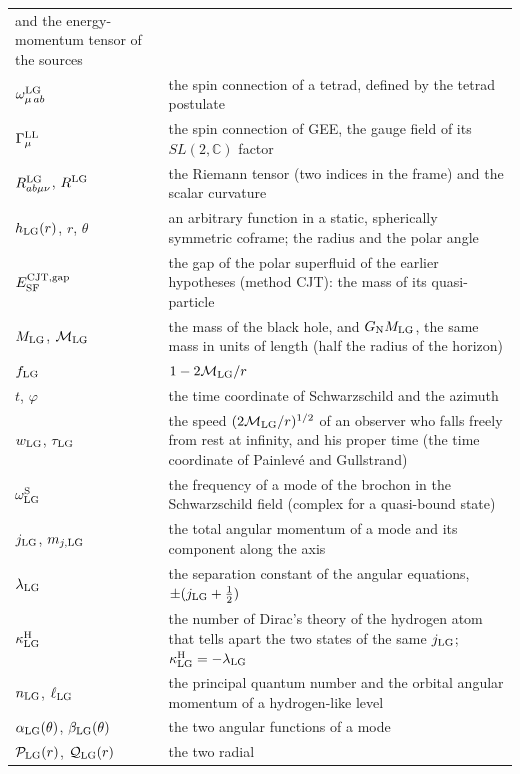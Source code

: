\documentclass[
  10pt,
]{article}
\begin{document}
\begin{longtable}[]{@{}
  >{\raggedright\arraybackslash}p{}
  >{\raggedright\arraybackslash}p{}@{}}
and the energy-momentum tensor of the sources \\
\(\omega^{\rm LG}_{\mu\,ab}\) & the spin connection of a tetrad, defined
by the tetrad postulate \\
\(\Gamma^{\rm LL}_\mu\) & the spin connection of GEE, the gauge field of
its \(SL(2,\mathbb C)\) factor \\
\(R^{\rm LG}_{ab\mu\nu}\), \(R^{\rm LG}\) & the Riemann tensor (two
indices in the frame) and the scalar curvature \\
\(h_{\rm LG}(r)\), \(r\), \(\theta\) & an arbitrary function in a
static, spherically symmetric coframe; the radius and the polar angle \\
\(E^{\rm CJT,gap}_{\rm SF}\) & the gap of the polar superfluid of the
earlier hypotheses (method CJT): the mass of its quasi-particle \\
\(M_{\rm LG}\), \(\mathcal M_{\rm LG}\) & the mass of the black hole,
and \(G_{\rm N}M_{\rm LG}\), the same mass in units of length (half the
radius of the horizon) \\
\(f_{\rm LG}\) & \(1-2\mathcal M_{\rm LG}/r\) \\
\(t\), \(\varphi\) & the time coordinate of Schwarzschild and the
azimuth \\
\(w_{\rm LG}\), \(\tau_{\rm LG}\) & the speed
\((2\mathcal M_{\rm LG}/r)^{1/2}\) of an observer who falls freely from
rest at infinity, and his proper time (the time coordinate of Painlevé
and Gullstrand) \\
\(\omega^{\rm S}_{\rm LG}\) & the frequency of a mode of the brochon in
the Schwarzschild field (complex for a quasi-bound state) \\
\(j_{\rm LG}\), \(m_{j,{\rm LG}}\) & the total angular momentum of a
mode and its component along the axis \\
\(\lambda_{\rm LG}\) & the separation constant of the angular equations,
\(\pm(j_{\rm LG}+\tfrac12)\) \\
\(\kappa^{\rm H}_{\rm LG}\) & the number of Dirac's theory of the
hydrogen atom that tells apart the two states of the same
\(j_{\rm LG}\); \(\kappa^{\rm H}_{\rm LG}=-\lambda_{\rm LG}\) \\
\(n_{\rm LG}\), \(\ell_{\rm LG}\) & the principal quantum number and the
orbital angular momentum of a hydrogen-like level \\
\(\alpha_{\rm LG}(\theta)\), \(\beta_{\rm LG}(\theta)\) & the two
angular functions of a mode \\
\(\mathcal P_{\rm LG}(r)\), \(\mathcal Q_{\rm LG}(r)\) & the two radial

\end{longtable}
\end{document}
